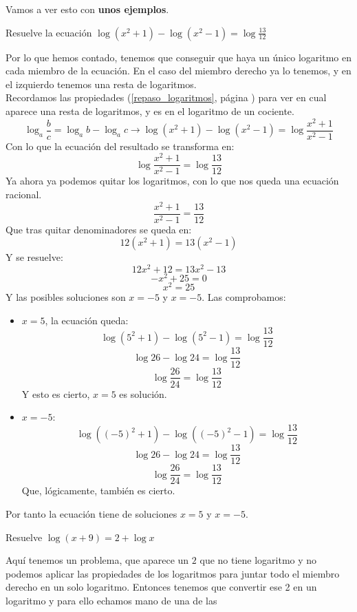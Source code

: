 \documentclass[a4paper,11pt,answers]{exam}
\begin{document}
\begin{itemize}
  Vamos a ver esto con \textbf{unos ejemplos}.
  \begin{questions}
  \question Resuelve la ecuación $\log (x^2 + 1) - \log (x^2 - 1) = \log \frac{13}{12}$
    \begin{solution}
      Por lo que hemos contado, tenemos que conseguir que haya un único logaritmo en cada miembro de
      la ecuación. En el caso del miembro derecho ya lo tenemos, y en el izquierdo tenemos una resta
      de logaritmos.\\
      Recordamos las propiedades (\ref{repaso_logaritmos}, página \pageref{repaso_logaritmos}) para
      ver en cual aparece una resta de
      logaritmos, y es en el logaritmo de un cociente.
      \[\log_a \frac{b}{c} = \log_a b - \log_a c \longrightarrow
        \log (x^2 + 1) - \log (x^2 - 1) = \log \frac{x^2 + 1}{x^2 - 1}\]
      Con lo que la ecuación del resultado se
      transforma en:
      \[\log \frac{x^2 + 1}{x^2 - 1} = \log \frac{13}{12}\]
      Ya ahora ya podemos quitar los logaritmos, con lo que nos queda una ecuación racional.
      \[\frac{x^2 + 1}{x^2 - 1} = \frac{13}{12}\]
      Que tras quitar denominadores se queda en:
      \[12(x^2 + 1) = 13(x^2 - 1)\]
      Y se resuelve:
      \[12x^2 + 12 = 13x^2 - 13\]
      \[-x^2 + 25 = 0\]
      \[x^2 = 25\]
      Y las posibles soluciones son $x = -5$ y $x = -5$. Las comprobamos:
      \begin{itemize}
      \item $x= 5$, la ecuación queda:
        \[\log (5^2 + 1) - \log (5^2 - 1) = \log \frac{13}{12}\]
        \[\log 26 - \log 24 = \log \frac{13}{12}\]
        \[\log \frac{26}{24} = \log \frac{13}{12}\]
        Y esto es cierto, $x = 5$ es solución.
      \item $x = -5$:
        \[\log ((-5)^2 + 1) - \log ((-5)^2 - 1) = \log \frac{13}{12}\]
        \[\log 26 - \log 24 = \log \frac{13}{12}\]
        \[\log \frac{26}{24} = \log \frac{13}{12}\]
        Que, lógicamente, también es cierto.
      \end{itemize}
      Por tanto la ecuación tiene de soluciones $x = 5$ y $x = -5$.
    \end{solution}
  \question Resuelve $\log (x + 9) = 2 + \log x$
    \begin{solution}
      Aquí tenemos un problema, que aparece un $2$ que no tiene logaritmo y no podemos aplicar las
      propiedades de los logaritmos para juntar todo el miembro derecho en un solo logaritmo.
      Entonces tenemos que convertir ese 2 en un logaritmo y para ello echamos mano de una de las

\end{solution}
\end{questions}
\end{itemize}
\end{document}
